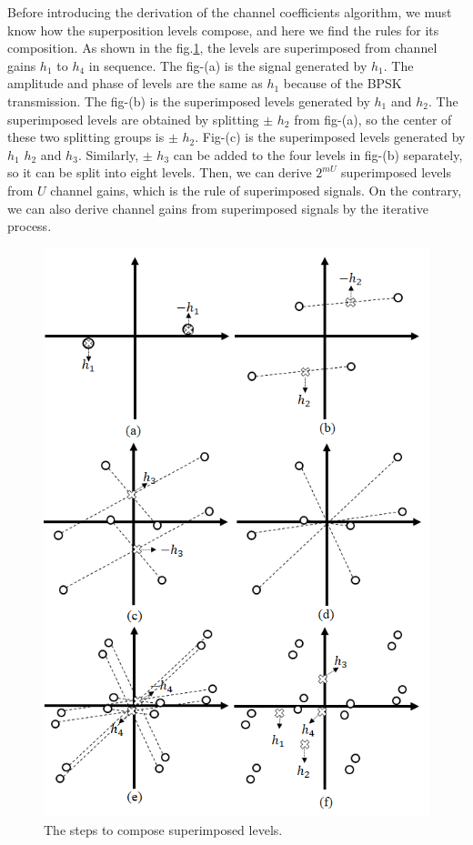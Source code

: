 Before introducing the derivation of the channel coefficients algorithm, we must know how the superposition levels compose, and here we find the rules for its composition. As shown in the fig.\ref{fig:superimposed_levels_composation}, the levels are superimposed from channel gains $h_1$ to $h_4$ in sequence. The fig-(a) is the signal generated by $h_1$. The amplitude and phase of levels are the same as $h_1$ because of the BPSK transmission. The fig-(b) is the superimposed levels generated by $h_1$ and $h_2$. The superimposed levels are obtained by splitting $\pm$ $h_2$ from fig-(a), so the center of these two splitting groups is $\pm$ $h_2$. Fig-(c) is the superimposed levels generated by $h_1$ $h_2$ and $h_3$. Similarly, $\pm$ $h_3$ can be added to the four levels in fig-(b) separately, so it can be split into eight levels. Then, we can derive $2^{mU}$ superimposed levels from $U$ channel gains, which is the rule of superimposed signals. On the contrary, we can also derive channel gains from superimposed signals by the iterative process.
\\



\begin{figure}[t!]
 \centering
 \includegraphics[width=15cm]{fig/superimposed_levels_composation.png}
 \caption{The steps to compose superimposed levels.}
 \label{fig:superimposed_levels_composation}
\end{figure}

